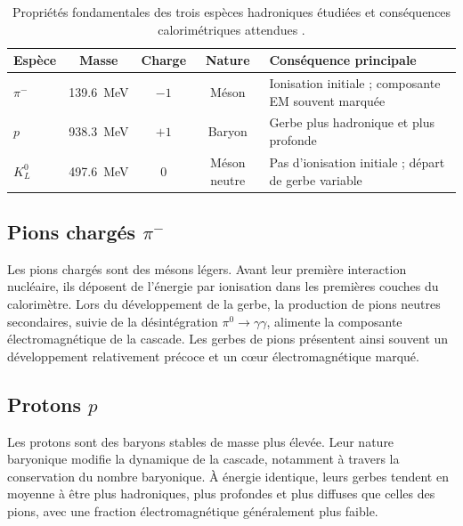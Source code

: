 \begin{table}[!ht]
    \centering
    \caption{Propriétés fondamentales des trois espèces hadroniques étudiées et conséquences calorimétriques attendues \cite{pdg2024}.}
    \label{tab:proprietes-pid}
    \renewcommand{\arraystretch}{1.35}
    \begin{tabularx}{\textwidth}{lccc>{\raggedright\arraybackslash}X}
        \hline
        \textbf{Espèce} & \textbf{Masse} & \textbf{Charge} & \textbf{Nature} &
        \textbf{Conséquence principale} \\
        \hline
        $\pi^-$   & 139.6~MeV & $-1$ & Méson   &
            Ionisation initiale ; composante EM souvent marquée \\
        $p$       & 938.3~MeV & $+1$ & Baryon  &
            Gerbe plus hadronique et plus profonde \\
        $K^0_L$   & 497.6~MeV & $0$  & Méson neutre &
            Pas d'ionisation initiale ; départ de gerbe variable \\
        \hline
    \end{tabularx}
\end{table}

\subsection{Pions chargés \texorpdfstring{$\pi^-$}{pi-}}

Les pions chargés sont des mésons légers. Avant leur première interaction nucléaire, ils déposent de l'énergie par ionisation dans les premières couches du calorimètre. Lors du développement de la gerbe, la production de pions neutres secondaires, suivie de la désintégration $\pi^0 \to \gamma\gamma$, alimente la composante électromagnétique de la cascade. Les gerbes de pions présentent ainsi souvent un développement relativement précoce et un cœur électromagnétique marqué.

\subsection{Protons \texorpdfstring{$p$}{p}}

Les protons sont des baryons stables de masse plus élevée. Leur nature baryonique modifie la dynamique de la cascade, notamment à travers la conservation du nombre baryonique. À énergie identique, leurs gerbes tendent en moyenne à être plus hadroniques, plus profondes et plus diffuses que celles des pions, avec une fraction électromagnétique généralement plus faible.

